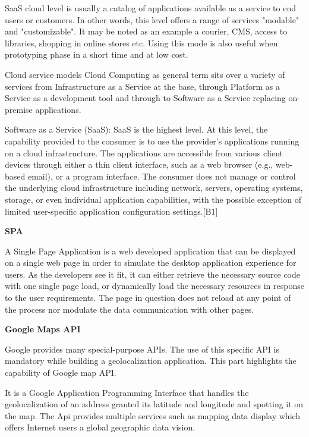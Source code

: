 \ifx
SaaS cloud level is usually a catalog of applications available as a service to end users or customers.
In other words, this level offers a range of services "modable" and "customizable". It may be noted as an example a courier, CMS, access to libraries, shopping in online stores etc.
Using this mode is also useful when prototyping phase in a short time and at low cost.

Cloud service models Cloud Computing as general term sits over a variety of services
from Infrastructure as a Service at the base, through Platform as a Service as a development
tool and through to Software as a Service replacing on-premise applications.

Software as a Service (SaaS): SaaS is the highest level. At this level, the capability
provided to the consumer is to use the provider’s applications running on a cloud infrastructure.
The applications are accessible from various client devices through either
a thin client interface, such as a web browser (e.g., web-based email), or a program interface.
The consumer does not manage or control the underlying cloud infrastructure including network, servers, operating systems, storage, or even individual application capabilities, with the possible exception of limited user-specific application configuration settings.[B1]

\item\textbf{SPA }

A Single Page Application is a web developed application that can be displayed on a single web page in order to simulate the desktop application experience for users.
As the developers see it fit, it can either retrieve the necessary source code with one single page load, or dynamically load the necessary resources in response to the user requirements. The page in question does not reload at any point of the process nor modulate the data communication with other pages.


\item\textbf{Google Maps API }

Google provides many special-purpose APIs. The use of this specific API is mandatory while building a geolocalization application.
This part highlights the capability of Google map API.

It is a Google Application Programming Interface that handles the geolocalization of an address granted its latitude and longitude and spotting it on the map.
The Api provides multiple services such as mapping data display which offers Internet users a global geographic data vision. 

